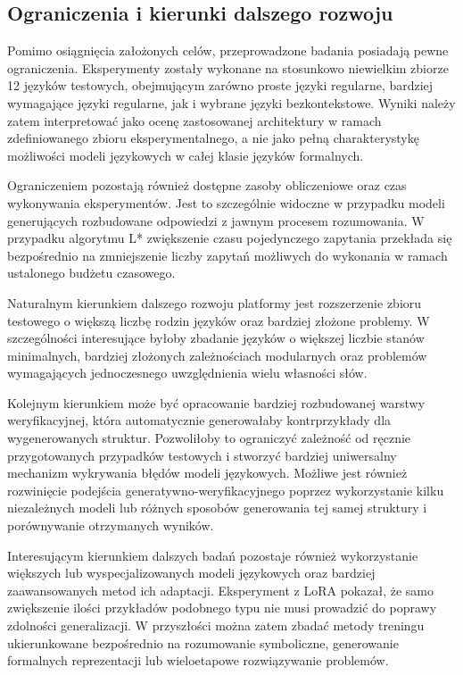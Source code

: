 \documentclass[12pt]{article}
\begin{document}
\subsection{Ograniczenia i kierunki dalszego rozwoju}

Pomimo osiągnięcia założonych celów, przeprowadzone badania posiadają pewne ograniczenia. Eksperymenty zostały wykonane na stosunkowo niewielkim zbiorze 12 języków testowych, obejmującym zarówno proste języki regularne, bardziej wymagające języki regularne, jak i wybrane języki bezkontekstowe. Wyniki należy zatem interpretować jako ocenę zastosowanej architektury w ramach zdefiniowanego zbioru eksperymentalnego, a nie jako pełną charakterystykę możliwości modeli językowych w całej klasie języków formalnych.

Ograniczeniem pozostają również dostępne zasoby obliczeniowe oraz czas wykonywania eksperymentów. Jest to szczególnie widoczne w przypadku modeli generujących rozbudowane odpowiedzi z jawnym procesem rozumowania. W przypadku algorytmu L* zwiększenie czasu pojedynczego zapytania przekłada się bezpośrednio na zmniejszenie liczby zapytań możliwych do wykonania w ramach ustalonego budżetu czasowego.

Naturalnym kierunkiem dalszego rozwoju platformy jest rozszerzenie zbioru testowego o większą liczbę rodzin języków oraz bardziej złożone problemy. W szczególności interesujące byłoby zbadanie języków o większej liczbie stanów minimalnych, bardziej złożonych zależnościach modularnych oraz problemów wymagających jednoczesnego uwzględnienia wielu własności słów.

Kolejnym kierunkiem może być opracowanie bardziej rozbudowanej warstwy weryfikacyjnej, która automatycznie generowałaby kontrprzykłady dla wygenerowanych struktur. Pozwoliłoby to ograniczyć zależność od ręcznie przygotowanych przypadków testowych i stworzyć bardziej uniwersalny mechanizm wykrywania błędów modeli językowych. Możliwe jest również rozwinięcie podejścia generatywno-weryfikacyjnego poprzez wykorzystanie kilku niezależnych modeli lub różnych sposobów generowania tej samej struktury i porównywanie otrzymanych wyników.

Interesującym kierunkiem dalszych badań pozostaje również wykorzystanie większych lub wyspecjalizowanych modeli językowych oraz bardziej zaawansowanych metod ich adaptacji. Eksperyment z LoRA pokazał, że samo zwiększenie ilości przykładów podobnego typu nie musi prowadzić do poprawy zdolności generalizacji. W przyszłości można zatem zbadać metody treningu ukierunkowane bezpośrednio na rozumowanie symboliczne, generowanie formalnych reprezentacji lub wieloetapowe rozwiązywanie problemów.
\end{document}
